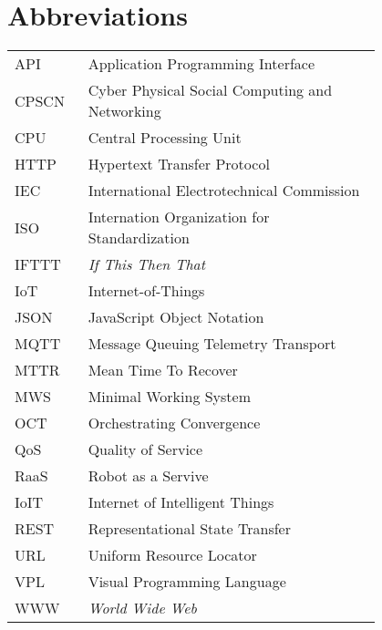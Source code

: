 \chapter*{Abbreviations}


\begin{flushleft}
\begin{tabular}{l p{0.8\linewidth}}
API      & Application Programming Interface\\
CPSCN    & Cyber Physical Social Computing and Networking\\
CPU      & Central Processing Unit\\
HTTP     & Hypertext Transfer Protocol\\
IEC      & International Electrotechnical Commission\\
ISO      & Internation Organization for Standardization\\
IFTTT    & \textit{If This Then That}\\
IoT      & Internet-of-Things\\
JSON     & JavaScript Object Notation\\
MQTT     & Message Queuing Telemetry Transport\\
MTTR     & Mean Time To Recover\\
MWS      & Minimal Working System\\
OCT      & Orchestrating Convergence\\
QoS      & Quality of Service\\
RaaS     & Robot as a Servive\\
IoIT     & Internet of Intelligent Things\\
REST     & Representational State Transfer\\
URL      & Uniform Resource Locator\\
VPL      & Visual Programming Language\\
WWW      & \textit{World Wide Web}\\
\end{tabular}
\end{flushleft}

